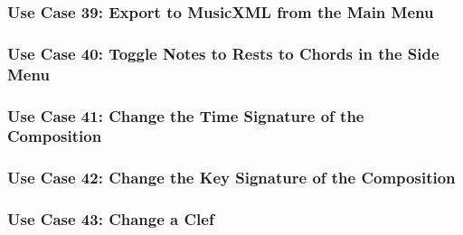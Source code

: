   \subsubsection{Use Case 39: Export to MusicXML from the Main Menu}


  \subsubsection{Use Case 40: Toggle Notes to Rests to Chords in the Side Menu}


  \subsubsection{Use Case 41: Change the Time Signature of the Composition}


  \subsubsection{Use Case 42: Change the Key Signature of the Composition}


  \subsubsection{Use Case 43: Change a Clef}



